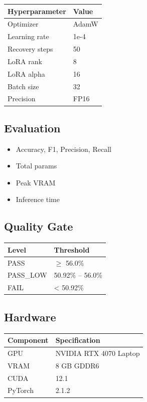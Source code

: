 \begin{table}[H]
\centering
\small
\begin{tabular}{ll}
\toprule
\textbf{Hyperparameter} & \textbf{Value} \\
\midrule
Optimizer & AdamW \\
Learning rate & 1e-4 \\
Recovery steps & 50 \\
LoRA rank & 8 \\
LoRA alpha & 16 \\
Batch size & 32 \\
Precision & FP16 \\
\bottomrule
\end{tabular}
\end{table}

\subsection{Evaluation}

\begin{itemize}
\item Accuracy, F1, Precision, Recall
\item Total params
\item Peak VRAM
\item Inference time

\end{itemize}
\subsection{Quality Gate}

\begin{table}[H]
\centering
\small
\begin{tabular}{ll}
\toprule
\textbf{Level} & \textbf{Threshold} \\
\midrule
PASS & $\ge$ 56.0\% \\
PASS\_LOW & 50.92\% -- 56.0\% \\
FAIL & < 50.92\% \\
\bottomrule
\end{tabular}
\end{table}

\subsection{Hardware}

\begin{table}[H]
\centering
\small
\begin{tabular}{ll}
\toprule
\textbf{Component} & \textbf{Specification} \\
\midrule
GPU & NVIDIA RTX 4070 Laptop \\
VRAM & 8 GB GDDR6 \\
CUDA & 12.1 \\
PyTorch & 2.1.2 \\
\bottomrule
\end{tabular}
\end{table}

